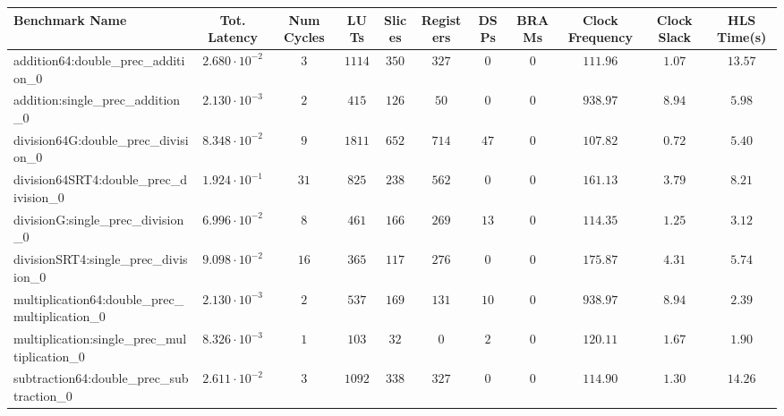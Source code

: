 \begin{tabular}{|l|c|c|c|c|c|c|c|c|c|c|}
\hline
Benchmark Name                                   & Tot. Latency            & Num Cycles & LUTs     & Slices   & Registers & DSPs   & BRAMs & Clock Frequency & Clock Slack & HLS Time(s) \\
\hline
addition64:double\_prec\_addition\_0             & $ 2.680 \cdot 10^{-2} $ & $ 3      $ & $ 1114 $ & $ 350  $ & $ 327   $ & $ 0  $ & $ 0 $ & $ 111.96      $ & $ 1.07    $ & $ 13.57   $ \\
addition:single\_prec\_addition\_0               & $ 2.130 \cdot 10^{-3} $ & $ 2      $ & $ 415  $ & $ 126  $ & $ 50    $ & $ 0  $ & $ 0 $ & $ 938.97      $ & $ 8.94    $ & $ 5.98    $ \\
division64G:double\_prec\_division\_0            & $ 8.348 \cdot 10^{-2} $ & $ 9      $ & $ 1811 $ & $ 652  $ & $ 714   $ & $ 47 $ & $ 0 $ & $ 107.82      $ & $ 0.72    $ & $ 5.40    $ \\
division64SRT4:double\_prec\_division\_0         & $ 1.924 \cdot 10^{-1} $ & $ 31     $ & $ 825  $ & $ 238  $ & $ 562   $ & $ 0  $ & $ 0 $ & $ 161.13      $ & $ 3.79    $ & $ 8.21    $ \\
divisionG:single\_prec\_division\_0              & $ 6.996 \cdot 10^{-2} $ & $ 8      $ & $ 461  $ & $ 166  $ & $ 269   $ & $ 13 $ & $ 0 $ & $ 114.35      $ & $ 1.25    $ & $ 3.12    $ \\
divisionSRT4:single\_prec\_division\_0           & $ 9.098 \cdot 10^{-2} $ & $ 16     $ & $ 365  $ & $ 117  $ & $ 276   $ & $ 0  $ & $ 0 $ & $ 175.87      $ & $ 4.31    $ & $ 5.74    $ \\
multiplication64:double\_prec\_multiplication\_0 & $ 2.130 \cdot 10^{-3} $ & $ 2      $ & $ 537  $ & $ 169  $ & $ 131   $ & $ 10 $ & $ 0 $ & $ 938.97      $ & $ 8.94    $ & $ 2.39    $ \\
multiplication:single\_prec\_multiplication\_0   & $ 8.326 \cdot 10^{-3} $ & $ 1      $ & $ 103  $ & $ 32   $ & $ 0     $ & $ 2  $ & $ 0 $ & $ 120.11      $ & $ 1.67    $ & $ 1.90    $ \\
subtraction64:double\_prec\_subtraction\_0       & $ 2.611 \cdot 10^{-2} $ & $ 3      $ & $ 1092 $ & $ 338  $ & $ 327   $ & $ 0  $ & $ 0 $ & $ 114.90      $ & $ 1.30    $ & $ 14.26   $ \\

\end{tabular}
